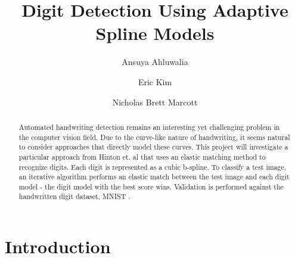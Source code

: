 \documentclass[oribibl]{llncs}
\begin{document}
\title{Digit Detection Using Adaptive Spline Models}
\author{ Ansuya Ahluwalia \and Eric Kim \and Nicholas Brett Marcott }
\maketitle

\begin{abstract}

Automated handwriting detection remains an interesting yet challenging problem in the computer vision field. Due to the curve-like nature of handwriting, it seems natural to consider approaches that directly model these curves. This project will investigate a particular approach from Hinton et. al \cite{Hinton92adaptiveelastic} that uses an elastic matching method to recognize digits. Each digit is represented as a cubic b-spline. To classify a test image, an iterative algorithm performs an elastic match between the test image and each digit model - the digit model with the best score wins. Validation is performed against the handwritten digit dataset, MNIST \cite{mnist}.

\end{abstract}


\section{Introduction}
\end{document}
